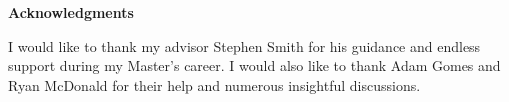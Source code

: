 
\cleardoublepage


\begin{center}\textbf{Acknowledgments}\end{center}

I would like to thank my advisor Stephen Smith for his guidance and endless support during my Master's career. I would also like to thank Adam Gomes and Ryan McDonald for their help and numerous insightful discussions.
\cleardoublepage

%
%

\renewcommand\contentsname{Table of Contents}
\tableofcontents
\cleardoublepage
{}

\listoftables
\cleardoublepage
{}		%

\listoffigures
\cleardoublepage
{}		%



